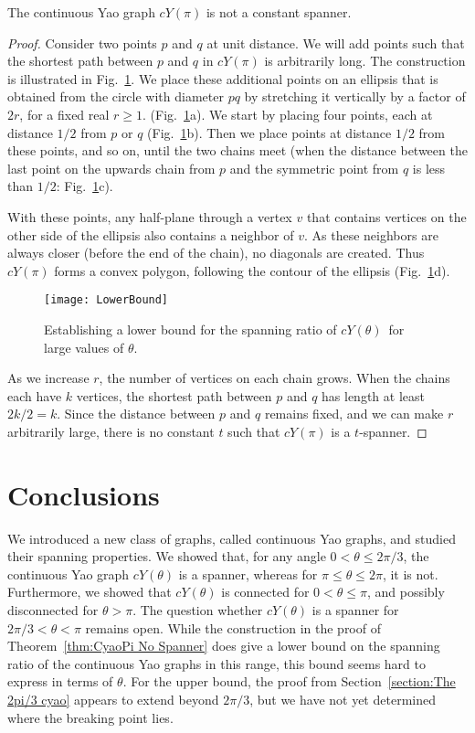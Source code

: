 \documentclass{cccg14}
\newcommand{\cyao}{\ensuremath{cY(\theta)}\xspace}
\newcommand{\cyaopi}{\ensuremath{cY(\pi)}\xspace}
\begin{document}
\begin{theorem}
 \label{thm:CyaoPi No Spanner}
 The continuous Yao graph \cyaopi is not a constant spanner.
\end{theorem}
\begin{proof}
 Consider two points $p$ and $q$ at unit distance. We will add points such that the shortest path between $p$ and $q$ in \cyaopi is arbitrarily long. The construction is illustrated in Fig.~\ref{fig:LowerBound}. We place these additional points on an ellipsis that is obtained from the circle with diameter $pq$ by stretching it vertically by a factor of $2r$, for a fixed real $r \ge 1$.  (Fig.~\ref{fig:LowerBound}a). We start by placing four points, each at distance $1/2$ from $p$ or $q$ (Fig.~\ref{fig:LowerBound}b). Then we place points at distance $1/2$ from these points, and so on, until the two chains meet (when the distance between the last point on the upwards chain from $p$ and the symmetric point from $q$ is less than $1/2$: Fig.~\ref{fig:LowerBound}c).
 
 With these points, any half-plane through a vertex $v$ that contains vertices on the other side of the ellipsis also contains a neighbor of $v$.
As these neighbors are always closer (before the end of the chain), no diagonals are created. Thus \cyaopi forms a convex polygon, following the contour of the ellipsis (Fig.~\ref{fig:LowerBound}d).

\begin{figure}[t]
 \centering
 \texttt{[image: LowerBound]}
 \caption{\small  Establishing a lower bound for the spanning ratio of \cyao\ for large values of $\theta$.}
 \label{fig:LowerBound}
\end{figure}

 As we increase $r$, the number of vertices on each chain grows. When the chains each have $k$ vertices, the shortest path between $p$ and $q$ has length at least $2  k/2 = k$. Since the distance between $p$ and $q$ remains fixed, and we can make $r$ arbitrarily large, there is no constant $t$ such that \cyaopi is a $t$-spanner.
\end{proof}

\section{Conclusions}
We introduced a new class of graphs, called continuous Yao graphs, and studied their spanning properties. We showed that, for any angle $0 < \theta \le 2\pi/3$, the continuous Yao graph \cyao is a spanner, whereas for $\pi \leq \theta \leq 2 \pi$, it is not. Furthermore, we showed that \cyao is connected for $0 < \theta \le \pi$, and possibly disconnected for $\theta > \pi$. The question whether \cyao is a spanner for $2\pi/3 < \theta < \pi$ remains open. While the construction in the proof of Theorem~\ref{thm:CyaoPi No Spanner} does give a lower bound on the spanning ratio of the continuous Yao graphs in this range, this bound seems hard to express in terms of $\theta$. For the upper bound, the proof from Section~\ref{section:The 2pi/3 cyao} appears to extend beyond $2\pi/3$, but we have not yet determined where the breaking point lies.
\end{document}
